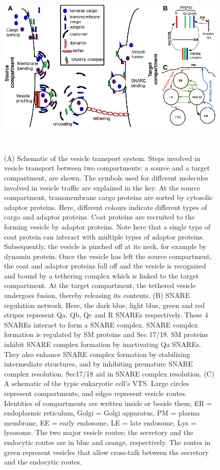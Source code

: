 \begin{figure}
  \begin{center}
	\includegraphics[height=9cm,width=12cm]{fig.png}
	\end{center}

	\caption{(A) Schematic of the vesicle transport system. Steps involved in vesicle transport between
		two compartments: a source and a target compartment, are shown. The symbols used for different
		molecules involved in vesicle traffic are explained in the key. At the source compartment,
		transmembrane cargo proteins are sorted by cytosolic adaptor proteins. Here, different colours
		indicate different types of cargo and adaptor proteins. Coat proteins are recruited to the forming
		vesicle by adaptor proteins. Note here that a single type of coat protein can interact with multiple
		types of adaptor proteins. Subsequently, the vesicle is pinched off at its neck, for example by dynamin
		protein. Once the vesicle has left the source compartment, the coat and adaptor proteins fall off and
		the vesicle is recognized and bound by a tethering complex which is linked to the target compartment.
		At the target compartment, the tethered vesicle undergoes fusion, thereby releasing its contents. (B)
		SNARE regulation network. Here, the dark blue, light blue, green and red stripes represent Qa, Qb,
		Qc and R SNAREs respectively. These 4 SNAREs interact to form a SNARE complex. SNARE
		complex formation is regulated by SM proteins and Sec 17/18. SM proteins inhibit SNARE complex
		formation by inactivating Qa SNAREs. They also enhance SNARE complex formation by stabilizing
		intermediate structures, and by inhibiting premature SNARE complex resolution. Sec17/18 aid in
		SNARE complex resolution. (C) A schematic of the typic eukaryotic cell's VTS. Large circles
		represent compartments, and edges represent vesicle routes. Identities of compartments are written
		inside or beside them; ER = endoplasmic reticulum, Golgi = Golgi apparatus, PM = plasma
		membrane, EE = early endosome, LE = late endosome, Lys = lysosome. The two major vesicle routes;
		the secretory and the endocytic routes are in blue and orange, respectively. The routes in green
		represent vesicles that allow cross-talk between the secretory and the endocytic routes. }
    \label{fig:vts}
\end{figure}

